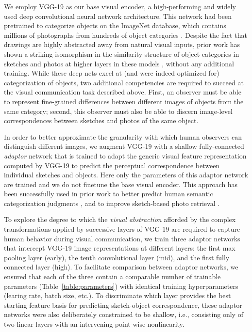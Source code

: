 \documentclass[9pt,twocolumn,twoside]{pnas-new}
\newcommand{\mwu}[1]{{\color{green}{[mwu: #1]}}}
\begin{document}
{We employ VGG-19 \cite{simonyan2014very} as our base visual encoder, a high-performing and widely used deep convolutional neural network architecture. This network had been pretrained to categorize objects on the ImageNet database, which contains millions of photographs from hundreds of object categories \cite{deng2009imagenet}. Despite the fact that drawings are highly abstracted away from natural visual inputs, prior work has shown a striking isomorphism in the similarity structure \cite{kriegeskorte2008matching} of object categories in sketches and photos at higher layers in these models \cite{FanCommon2018}, without any additional training. While these deep nets excel at (and were indeed optimized for) categorization of objects, two additional competencies are required to succeed at the visual communication task described above. First, an observer must be able to represent fine-grained differences between different images of objects from the same category; second, this observer must also be able to discern image-level correspondences between sketches and photos of the same object.\mwu{maybe we can say: image-level differences are easy -- we can use VGG off the shelf. To dscern fine-grain detail, we need an adaptor.}

In order to better approximate the granularity with which human observers can distinguish different images, we augment VGG-19 with a shallow fully-connected \textit{adaptor} network that is trained to adapt the generic visual feature representation computed by VGG-19 to predict the perceptual correspondence between individual sketches and objects. Here only the parameters of this adaptor network are trained and we do not finetune the base visual encoder. This approach has been successfully used in prior work to better predict human semantic categorization judgments \cite[]{peterson2016adapting}, and to improve sketch-based photo retrieval \cite[]{sangkloy2016sketchy}.

To explore the degree to which the \textit{visual abstraction} afforded by the complex transformations applied by successive layers of VGG-19 are required to capture human behavior during visual communication, we train three adaptor networks that intercept VGG-19 image representations at different layers: the first max pooling layer (early), the tenth convolutional layer (mid), and the first fully connected layer (high). \mwu{add something about early being edges, high being object recognition masks, etc.} To facilitate comparison between adaptor networks, we ensured that each of the three contain a comparable number of trainable parameters (Table~\ref{table:parameters}) with identical training hyperparameters (learing rate, batch size, etc.). To discriminate which layer provides the best starting feature basis for predicting sketch-object correspondence, these adaptor networks were also deliberately constrained to be shallow, i.e., consisting only of two linear layers with an intervening point-wise nonlinearity.

}
\end{document}
